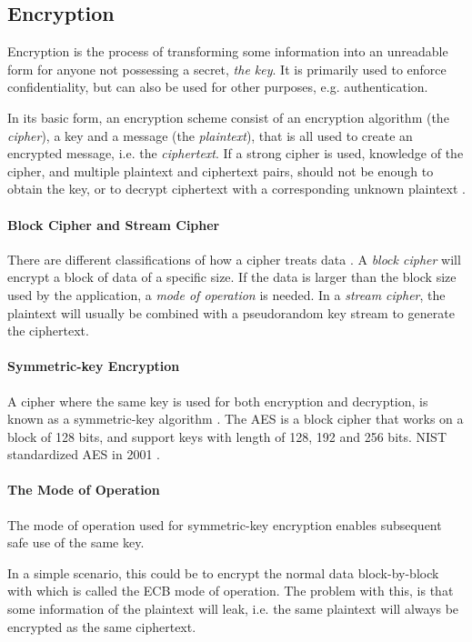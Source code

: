\documentclass[pdftex,english,10pt,b5paper,twoside]{book}
\begin{document}
\subsection{Encryption}

Encryption is the process of transforming some information into an unreadable
form for anyone not possessing a secret, \emph{the key}. It is primarily used
to enforce confidentiality, but can also be used for other purposes, e.g.
authentication.

In its basic form, an encryption scheme consist of an encryption algorithm
(the \emph{cipher}), a key and a message (the \emph{plaintext}), that is all
used to create an encrypted message, i.e. the \emph{ciphertext}. If a strong
cipher is used, knowledge of the cipher, and multiple plaintext and ciphertext
pairs, should not be enough to obtain the key, or to decrypt ciphertext
with a corresponding unknown plaintext \cite{schneier}.

\paragraph{Block Cipher and Stream Cipher} There are different classifications
of how a cipher treats data \cite[p. 32]{stallings}. A \emph{block cipher} will
encrypt a block of data of a specific size. If the data is larger than the
block size used by the application, a \emph{mode of operation} is needed. In a
\emph{stream cipher}, the plaintext will usually be combined with a pseudorandom key
stream to generate the ciphertext.

\paragraph{Symmetric-key Encryption} A cipher where the same key is used for
both encryption and decryption, is known as a symmetric-key algorithm \cite[p.
32]{stallings}. The \ac{AES} is a block cipher that works on a block of 128
bits, and support keys with length of 128, 192 and 256 bits. \ac{NIST}
standardized \ac{AES} in 2001 \cite{AES-FIPS}.

\paragraph{The Mode of Operation} The mode of operation used for
symmetric-key encryption enables subsequent safe use of the same key.

In a simple scenario, this could be to encrypt the normal data block-by-block
with which is called the \ac{ECB} mode of operation. The problem with
this, is that some information of the plaintext will leak, i.e. the same
plaintext will always be encrypted as the same ciphertext.
\end{document}
